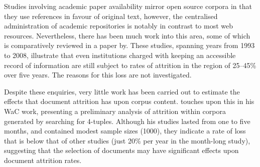 

Studies involving academic paper availability mirror open source corpora in that they use references in favour of original text, however, the centralised administration of academic repositories is notably in contrast to most web resources.  Nevertheless, there has been much work into this area, some of which is comparatively reviewed in a paper by\cite{sanderson2011analyzing}.  These studies, spanning years from 1993 to 2008, illustrate that even institutions charged with keeping an accessible record of information are still subject to rates of attrition in the region of 25--45\% over five years.  The reasons for this loss are not investigated.



Despite these enquiries, very little work has been carried out to estimate the effects that document attrition has upon corpus content.  %
\cite{sharoff2006creating} touches upon this in his WaC work, presenting a preliminary analysis of attrition within corpora generated by searching for 4-tuples.  Although his studies lasted from one to five months, and contained modest sample sizes (1000), they indicate a rate of loss that is below that of other studies (just 20\% per year in the month-long study), suggesting that the selection of documents may have significant effects upon document attrition rates.




